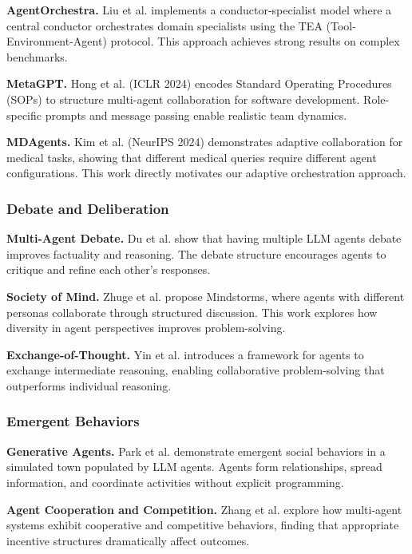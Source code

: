 \documentclass{article}
\theoremstyle{plain}
\theoremstyle{definition}
\theoremstyle{remark}
\begin{document}
\textbf{AgentOrchestra.} Liu et al. \citep{liu2025agentorchestra} implements a conductor-specialist model where a central conductor orchestrates domain specialists using the TEA (Tool-Environment-Agent) protocol. This approach achieves strong results on complex benchmarks.

\textbf{MetaGPT.} Hong et al. \citep{hong2024metagpt} (ICLR 2024) encodes Standard Operating Procedures (SOPs) to structure multi-agent collaboration for software development. Role-specific prompts and message passing enable realistic team dynamics.

\textbf{MDAgents.} Kim et al. \citep{kim2024mdagents} (NeurIPS 2024) demonstrates adaptive collaboration for medical tasks, showing that different medical queries require different agent configurations. This work directly motivates our adaptive orchestration approach.

\subsubsection{Debate and Deliberation}

\textbf{Multi-Agent Debate.} Du et al. \citep{du2023multiagent} show that having multiple LLM agents debate improves factuality and reasoning. The debate structure encourages agents to critique and refine each other's responses.

\textbf{Society of Mind.} Zhuge et al. \citep{zhuge2023mindstorms} propose Mindstorms, where agents with different personas collaborate through structured discussion. This work explores how diversity in agent perspectives improves problem-solving.

\textbf{Exchange-of-Thought.} Yin et al. \citep{yin2023exchange} introduces a framework for agents to exchange intermediate reasoning, enabling collaborative problem-solving that outperforms individual reasoning.

\subsubsection{Emergent Behaviors}

\textbf{Generative Agents.} Park et al. \citep{park2023generative} demonstrate emergent social behaviors in a simulated town populated by LLM agents. Agents form relationships, spread information, and coordinate activities without explicit programming.

\textbf{Agent Cooperation and Competition.} Zhang et al. \citep{zhang2023exploring} explore how multi-agent systems exhibit cooperative and competitive behaviors, finding that appropriate incentive structures dramatically affect outcomes.
\end{document}

